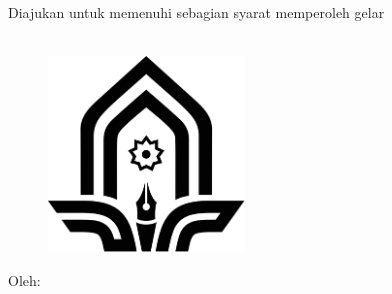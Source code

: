 %
%
%

\thispagestyle{plain}

\begin{center}

    \vspace*{0.5cm}
    {\normalfont\large\bo{\Judul}} \\%

    \vspace*{1cm}
    \bo{\MakeUppercase{\Type}} \\

    \vspace*{1cm}
        Diajukan untuk memenuhi sebagian syarat memperoleh gelar \\
    \gelar\\

    \vspace*{1cm}
        \begin{figure}
        \begin{center}
            \includegraphics[width=5.22cm]{assets/pics/logo-aswad.ps}
        \end{center}
    \end{figure}

    \vspace*{1cm}
    Oleh:\\
    \underline{\bo{\Penulis}} \\
     \\

    \vfill

    {\normalfont\large{}}
\end{center}
\newpage

